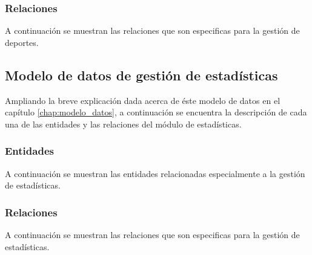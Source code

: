 \subsubsection{Relaciones}
A continuación se muestran las relaciones que son especificas para la gestión de deportes.

\clearpage














\subsection{Modelo de datos de gestión de estadísticas}
Ampliando la breve explicación dada acerca de éste modelo de datos en el capítulo \ref{chap:modelo_datos}, a continuación se encuentra la descripción de cada una de las entidades y las relaciones del módulo de estadísticas.

\subsubsection{Entidades}
A continuación se muestran las entidades relacionadas especialmente a la gestión de estadísticas.

\clearpage



\subsubsection{Relaciones}
A continuación se muestran las relaciones que son especificas para la gestión de estadísticas.

\clearpage





